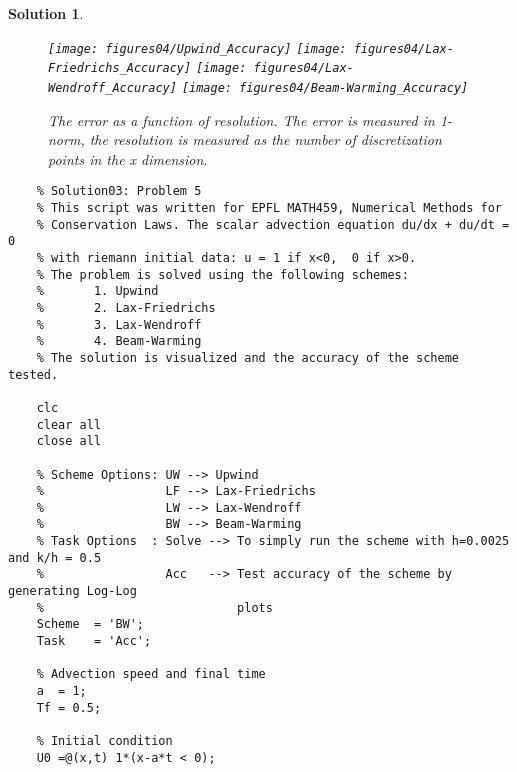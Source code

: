 \documentclass[10pt,letterpaper]{article}
\theoremstyle{break}
\newtheorem{mysolution}{Solution}
\newenvironment{solution}{\begin{mysolution}}{\end{mysolution}}
\begin{document}
\begin{solution}
    
    
    \begin{figure}[H] 
    \begin{center}
    {\texttt{[image: figures04/Upwind\_Accuracy]}} 
    {\texttt{[image: figures04/Lax-Friedrichs\_Accuracy]}} 
    {\texttt{[image: figures04/Lax-Wendroff\_Accuracy]}} 
    {\texttt{[image: figures04/Beam-Warming\_Accuracy]}} 
    \caption{ The error as a function of resolution. The error is measured in 1-norm, the resolution is measured as the number of discretization points in the x dimension. }
    \end{center}
    \end{figure}
    
    
    
    
    \newpage
    
    
    
    \begin{lstlisting}
    % Solution03: Problem 5
    % This script was written for EPFL MATH459, Numerical Methods for
    % Conservation Laws. The scalar advection equation du/dx + du/dt = 0
    % with riemann initial data: u = 1 if x<0,  0 if x>0.
    % The problem is solved using the following schemes:
    %       1. Upwind
    %       2. Lax-Friedrichs
    %       3. Lax-Wendroff
    %       4. Beam-Warming
    % The solution is visualized and the accuracy of the scheme tested.
    
    clc
    clear all
    close all
    
    % Scheme Options: UW --> Upwind
    %                 LF --> Lax-Friedrichs
    %                 LW --> Lax-Wendroff
    %                 BW --> Beam-Warming
    % Task Options  : Solve --> To simply run the scheme with h=0.0025 and k/h = 0.5
    %                 Acc   --> Test accuracy of the scheme by generating Log-Log
    %                           plots
    Scheme 	= 'BW';
    Task 	= 'Acc';
    
    % Advection speed and final time
    a  = 1;
    Tf = 0.5;
    
    % Initial condition
    U0 =@(x,t) 1*(x-a*t < 0);
    

\end{lstlisting}
\end{solution}
\end{document}
